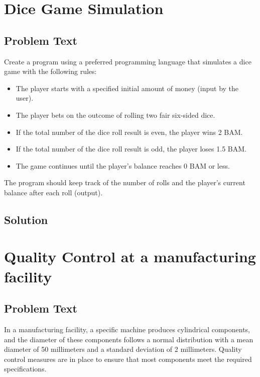 \documentclass[a4paper, 10pt]{article}
\begin{document}
    \section{Dice Game Simulation}
        \subsection{Problem Text}
            Create a program using a preferred programming language that simulates a dice game with the following rules:

            \begin{itemize}
                \item The player starts with a specified initial amount of money (input by the user).
                \item The player bets on the outcome of rolling two fair six-sided dice.
                \item If the total number of the dice roll result is even, the player wins 2 BAM.
                \item If the total number of the dice roll result is odd, the player loses 1.5 BAM.
                \item The game continues until the player's balance reaches 0 BAM or less.
            \end{itemize}

            The program should keep track of the number of rolls and the player's current balance after each roll (output).

        \subsection{Solution}
            
    
    
    
    \section{Quality Control at a manufacturing facility}
        \subsection{Problem Text}
            In a manufacturing facility, a specific machine produces cylindrical components, and the diameter of these components follows a normal distribution with a mean diameter of 50 millimeters and a standard deviation of 2 millimeters. Quality control measures are in place to ensure that most components meet the required specifications.
\end{document}
